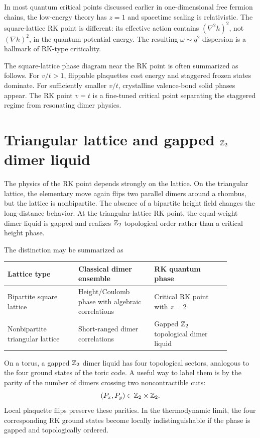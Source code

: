 \begin{remark}
In most quantum critical points discussed earlier in one-dimensional free
fermion chains, the low-energy theory has \(z=1\) and spacetime scaling is
relativistic.  The square-lattice RK point is different: its effective action
contains \((\nabla^2 h)^2\), not \((\nabla h)^2\), in the quantum potential
energy.  The resulting \(\omega\sim q^2\) dispersion is a hallmark of RK-type
criticality.
\end{remark}

The square-lattice phase diagram near the RK point is often summarized as
follows.  For \(v/t>1\), flippable plaquettes cost energy and staggered frozen
states dominate.  For sufficiently smaller \(v/t\), crystalline valence-bond
solid phases appear.  The RK point \(v=t\) is a fine-tuned critical point
separating the staggered regime from resonating dimer physics.

\section{Triangular lattice and gapped \texorpdfstring{\(\mathbb{Z}_2\)}{Z2} dimer liquid}
\label{sec:triangular-rk-liquid}

The physics of the RK point depends strongly on the lattice.  On the triangular
lattice, the elementary move again flips two parallel dimers around a rhombus,
but the lattice is nonbipartite.  The absence of a bipartite height field changes
the long-distance behavior.  At the triangular-lattice RK point, the equal-weight
dimer liquid is gapped and realizes \(\mathbb{Z}_2\) topological order rather than a
critical height phase.

The distinction may be summarized as
\begin{center}
\begin{tabular}{L{0.28\linewidth}L{0.30\linewidth}L{0.30\linewidth}}
\toprule
Lattice type & Classical dimer ensemble & RK quantum phase \\
\midrule
Bipartite square lattice & Height/Coulomb phase with algebraic correlations & Critical RK point with \(z=2\) \\
Nonbipartite triangular lattice & Short-ranged dimer correlations & Gapped \(\mathbb{Z}_2\) topological dimer liquid \\
\bottomrule
\end{tabular}
\end{center}

On a torus, a gapped \(\mathbb{Z}_2\) dimer liquid has four topological sectors,
analogous to the four ground states of the toric code.  A useful way to label
them is by the parity of the number of dimers crossing two noncontractible cuts:
\begin{equation}
\label{eq:z2-dimer-winding-parities}
    (P_x,P_y)\in\mathbb{Z}_2\times\mathbb{Z}_2 .
\end{equation}
Local plaquette flips preserve these parities.  In the thermodynamic limit, the
four corresponding RK ground states become locally indistinguishable if the
phase is gapped and topologically ordered.

